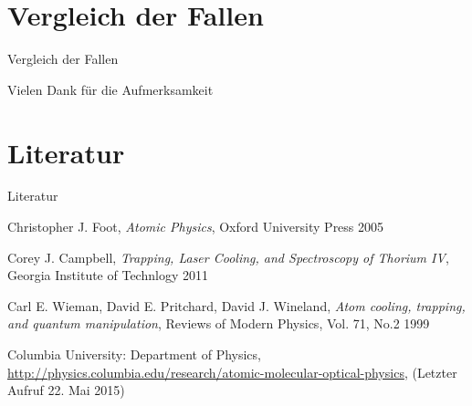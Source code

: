 \documentclass[12pt,xcolor=dvipsnames]{beamer}
\begin{document}
\section{Vergleich der Fallen}

\begin{frame}{Vergleich der Fallen}
	
	
\end{frame}

\begin{frame}{Vielen Dank für die Aufmerksamkeit}
\end{frame}

\section{Literatur}

\begin{frame}{Literatur}
	\begin{thebibliography}{9}
		Christopher J. Foot,
		\emph{Atomic Physics},
		Oxford University Press 2005
		
		Corey J. Campbell,
		\emph{Trapping, Laser Cooling, and Spectroscopy of Thorium IV},
		Georgia Institute of Technlogy 2011
		
		Carl E. Wieman, David E. Pritchard, David J. Wineland,
		\emph{Atom cooling, trapping, and quantum manipulation},
		Reviews of Modern Physics, Vol. 71, No.2 1999
		
		Columbia University: Department of Physics,
		\url{http://physics.columbia.edu/research/atomic-molecular-optical-physics},
		(Letzter Aufruf 22. Mai 2015)
		
		
	\end{thebibliography}
	
\end{frame}
\end{document}
